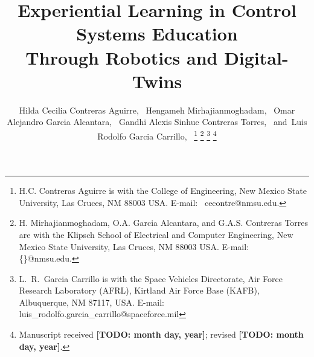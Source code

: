 \documentclass[journal]{IEEEtran}
\newcommand{\todo}[1]{\textbf{[TODO: #1]}}
\begin{document}
\title{Experiential Learning in Control Systems Education\\ Through Robotics and Digital-Twins}

\author{Hilda Cecilia Contreras Aguirre,~\IEEEmembership{}
        Hengameh Mirhajianmoghadam,~\IEEEmembership{}
        Omar Alejandro Garcia Alcantara,~\IEEEmembership{}
        Gandhi Alexis Sinhue Contreras Torres,~\IEEEmembership{}
        and~Luis Rodolfo Garcia Carrillo,~%
\thanks{H.C. Contreras Aguirre is with the College of Engineering, New Mexico State University, Las Cruces, NM 88003 USA. E-mail: \ cecontre@nmsu.edu.}%
\thanks{H. Mirhajianmoghadam, O.A. Garcia Alcantara, and G.A.S. Contreras Torres are with the Klipsch School of Electrical and Computer Engineering, New Mexico State University, Las Cruces, NM 88003 USA. E-mail: \{\}@nmsu.edu.}%
\thanks{L.~R.~Garcia Carrillo is with the Space Vehicles Directorate, Air Force Research Laboratory (AFRL), Kirtland Air Force Base (KAFB), Albuquerque, NM 87117, USA. E-mail: luis\_rodolfo.garcia\_carrillo@spaceforce.mil}
\thanks{Manuscript received \todo{month day, year}; revised \todo{month day, year}.}%
}

\maketitle
\end{document}
